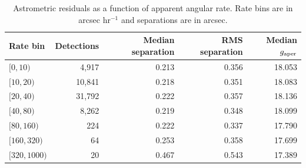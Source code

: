 \begin{table}
\centering
\caption{Astrometric residuals as a function of apparent angular rate. Rate bins are in arcsec hr$^{-1}$ and separations are in arcsec.}
\label{tab:rate_astrometry}
\footnotesize
\setlength{\tabcolsep}{6pt}
\renewcommand{\arraystretch}{1.12}
\begin{tabular}{lrrrr}
\toprule
Rate bin & Detections & Median separation & RMS separation & Median $g_{\rm aper}$ \\
\midrule
$[0,10)$ & 4,917 & 0.213 & 0.356 & 18.053 \\
$[10,20)$ & 10,841 & 0.218 & 0.351 & 18.083 \\
$[20,40)$ & 31,792 & 0.222 & 0.357 & 18.136 \\
$[40,80)$ & 8,262 & 0.219 & 0.348 & 18.099 \\
$[80,160)$ & 224 & 0.222 & 0.337 & 17.790 \\
$[160,320)$ & 64 & 0.253 & 0.358 & 17.699 \\
$[320,1000)$ & 20 & 0.467 & 0.543 & 17.389 \\
\bottomrule
\end{tabular}
\end{table}
